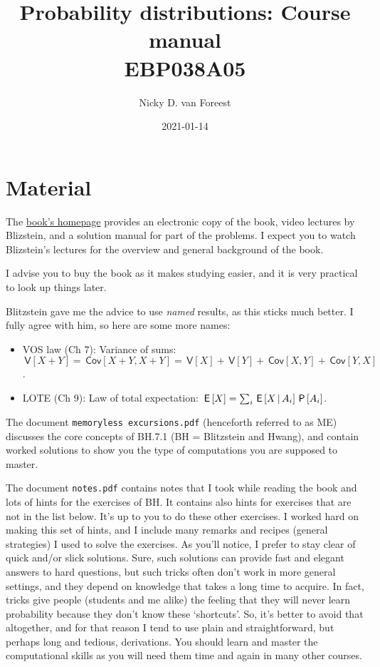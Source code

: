 \documentclass[a4paper]{article}
\author{Nicky D. van Foreest}
\date{2021-01-14}
\title{Probability distributions: Course manual\\\medskip
\large EBP038A05}
\theoremstyle{definition}
\newcommand{\given}{\,\middle|\,}
\renewcommand{\P}[1]{\,\mathsf{P}\left[#1\right]}
\newcommand{\E}[1]{\,\mathsf{E}\/\left[#1\right]}
\newcommand{\V}[1]{\,\mathsf{V}\left[#1\right]}
\newcommand{\cov}[1]{\,\mathsf{Cov}\left[#1\right]}
\newcommand{\1}[1]{\,I_{#1}} %
\begin{document}
\maketitle
\tableofcontents


\section{Material}
\label{sec:orgfd9c538}

The \href{https://projects.iq.harvard.edu/stat110/home}{book's homepage} provides an electronic copy of the book, video lectures by Blizstein, and a solution manual for part of the problems.
I expect you to watch Blizstein's lectures for the overview and general background of the book.

I advise you to buy the book as it makes studying easier, and it is very practical to look up things later.

Blitzstein gave me  the advice to use \emph{named} results, as this sticks much better. I fully agree with him, so here are some more names:
\begin{itemize}
\item VOS law (Ch 7): Variance of sums: \(\V{X+Y}= \cov{X+Y, X+Y} = \V X + \V Y + \cov{X,Y} + \cov{Y, X}\).
\item LOTE  (Ch 9):  Law of total expectation: \(\E{X} = \sum_{i} \E{X \given A_i} \P{A_i}\).
\end{itemize}

The document \texttt{memoryless excursions.pdf} (henceforth referred to as ME) discusses the core concepts of BH.7.1 (BH = Blitzstein and Hwang), and contain worked solutions to show you the type of computations you are supposed to master. 

The document \texttt{notes.pdf} contains notes that I took while reading the book and lots of hints for the exercises of BH.
It contains also hints for exercises that are not in the list below.
It's up to you to do these other exercises.
I worked hard on making this set of hints, and I include many remarks and recipes (general strategies) I used to solve the exercises.
As you'll notice, I prefer to stay clear of quick and/or slick solutions.
Sure, such solutions can provide fast and elegant answers to hard questions, but such tricks often don't work in more general settings, and they depend on knowledge that takes a long time to acquire.
In fact, tricks give people (students and me alike) the feeling that they will never learn probability because they don't know these `shortcuts'.
So, it's better to avoid that altogether, and for that reason I tend to use plain and straightforward, but perhaps long and tedious, derivations.
You should learn and master the computational skills as you will need them time and again in many other courses.
\end{document}
